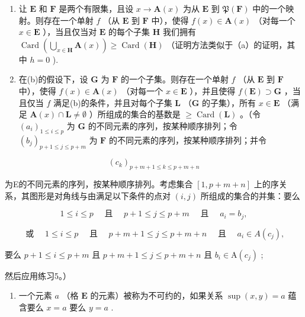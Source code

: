 \begin{enumerate}
\def\labelenumi{(\alph{enumi})}
\setcounter{enumi}{1}
\item
  让 \(\mathbf{E}\) 和 \(\mathbf{F}\) 是两个有限集，且设 \(x \to \mathbf{A}(x)\) 为从 \(\mathbf{E}\) 到 \(\mathfrak{P}(\mathbf{F})\) 中的一个映射。则存在一个单射 \(f\) （从 \(\mathbf{E}\) 到 \(\mathbf{F}\) 中），使得 \(f(x) \in \mathbf{A}(x)\) （对每一个 \(x \in \mathbf{E}\) ），当且仅当对 \(\mathbf{E}\) 的每个子集 \(\mathbf{H}\) 我们拥有 \(\operatorname{Card}\left(\bigcup_{x \in \mathbf{H}} \mathbf{A}(x)\right) \geqslant \operatorname{Card}(\mathbf{H})\) （证明方法类似于（a）的证明，其中 \(h = 0\) ).
\item
  在(b)的假设下，设 \(\mathbf{G}\) 为 \(\mathbf{F}\) 的一个子集。则存在一个单射 \(f\) （从 \(\mathbf{E}\) 到 \(\mathbf{F}\) 中），使得 \(f(x) \in \mathbf{A}(x)\) （对每一个 \(x \in \mathbf{E}\) ），并且使得 \(f(\mathbf{E}) \supset \mathbf{G}\) ，当且仅当 \(f\) 满足(b)的条件，并且对每个子集 \(\mathbf{L}\) （\(\mathbf{G}\) 的子集），所有 \(x \in \mathbf{E}\) （满足 \(\mathbf{A}(x) \cap \mathbf{L} \neq \emptyset\) ）所组成的集合的基数是 \(\geqslant \operatorname{Card}(\mathbf{L})\) 。（令 \((a_i)_{1 \leqslant i \leqslant p}\) 为 \(\mathbf{G}\) 的不同元素的序列，按某种顺序排列；令 \((b_j)_{p+1 \leqslant j \leqslant p+m}\) 为 \(\mathbf{F}\) 的不同元素的序列，按某种顺序排列；并令
\end{enumerate}

\[
\left(c _ {k}\right) _ {p + m + 1 \leqslant k \leqslant p + m + n}
\]

为E的不同元素的序列，按某种顺序排列。考虑集合 \([1, p + m + n]\) 上的序关系，其图形是对角线与由满足以下条件的点对 \((i, j)\) 所组成的集合的并集：要么

\[
1 \leqslant i \leqslant p \quad \text { 且 } \quad p + 1 \leqslant j \leqslant p + m \quad \text { 且 } \quad a _ {i} = b _ {j},
\]

\[
\text { 或 } \quad 1 \leqslant i \leqslant p \quad \text { 且 } \quad p + m + 1 \leqslant j \leqslant p + m + n \quad \text { 且 } \quad a _ {i} \in A (c _ {j}),
\]

要么 \(p + 1 \leqslant i \leqslant p + m\) 且 \(p + m + 1 \leqslant j \leqslant p + m + n\) 且 \(b_i \in \mathrm{A}(c_j)\) ;

然后应用练习5。）

\begin{enumerate}
\def\labelenumi{\arabic{enumi}.}
\setcounter{enumi}{6}
\tightlist
\item
  一个元素 \(a\) （格 \(\mathbf{E}\) 的元素）被称为不可约的，如果关系 \(\sup (x, y) = a\) 蕴含要么 \(x = a\) 要么 \(y = a\) .
\end{enumerate}

